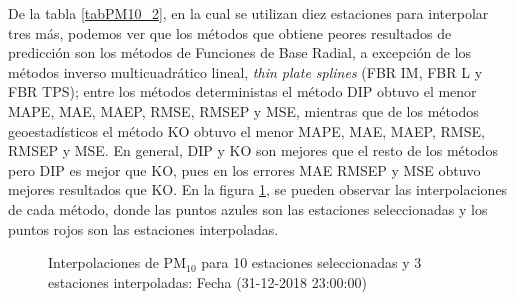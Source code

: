 De la tabla \ref{tabPM10_2}, en la cual se utilizan diez estaciones para interpolar tres más, podemos ver que los métodos que obtiene peores resultados de predicción son los métodos de Funciones de Base Radial, a excepción de los métodos inverso multicuadrático lineal, {\em thin plate splines} (FBR IM, FBR L y FBR TPS); entre los métodos deterministas el método DIP obtuvo el menor MAPE, MAE, MAEP, RMSE, RMSEP y MSE, mientras que de los métodos geoestadísticos el método KO obtuvo el menor MAPE, MAE, MAEP, RMSE, RMSEP y MSE. En general, DIP y KO son mejores que el resto de los métodos pero DIP es mejor que KO, pues en los errores MAE RMSEP y MSE obtuvo mejores resultados que KO. En la figura \ref{PM10figure2}, se pueden observar las interpolaciones de cada método, donde las puntos azules son las estaciones seleccionadas y los puntos rojos son las estaciones interpoladas.

 
\begin{figure}[H]
\centering
{}
\subfigure[KO] {\texttt{[image: ./ok\_10\_5\_26302]}}
\subfigure[KU] {\texttt{[image: ./uk\_10\_5\_26302]}}
\caption{Interpolaciones de PM$_{10}$ para 10 estaciones seleccionadas y 3 estaciones interpoladas: Fecha (31-12-2018 23:00:00)}
\label{PM10figure2}
\end{figure}


